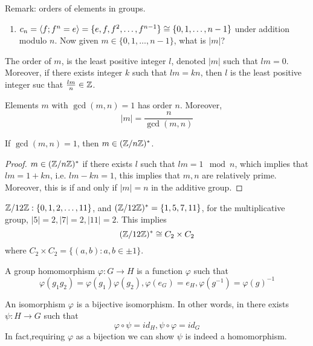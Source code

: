 Remark: orders of elements in groups.
\begin{enumerate}
    \item $c_n=\langle f; f^n=e\rangle=\{e, f, f^2, \dots, f^{n-1}\}\cong \{0,1,\dots, n-1\}$ under addition modulo $n$. Now given $m\in\{0,1,\dots,n-1\}$, what is $|m|$?
\end{enumerate}
\begin{defn}[order]
    The order of $m$, is the least positive integer $l$, denoted $|m|$ such that $lm=0$. Moreover, if there exists integer $k$ such that $lm=kn$, then $l$ is the least positive integer suc that $\frac{lm}{n}\in\mathbb{Z}$.
\end{defn}
\begin{prop}
    Elements $m$ with $\gcd(m,n)=1$ has order $n$.
    Moreover, 
    \begin{equation*}
        |m|=\frac{n}{\gcd(m,n)}
    \end{equation*}
\end{prop}
\begin{prop}
    If $\gcd(m,n)=1$, then $m\in(\mathbb{Z}/n\mathbb{Z})^*$.
\end{prop}
\begin{proof}
    $m\in(\mathbb{Z}/n\mathbb{Z})^*$ if there exists $l$ such that $lm=1\mod n$, which implies that $lm=1+kn$, i.e. $lm-kn=1$, this implies that $m,n$ are relatively prime. Moreover, this is if and only if $|m|=n$ in the additive group.
\end{proof}
\begin{example}
    $\mathbb{Z}/12\mathbb{Z}: \{0,1,2,\dots, 11\}$, and $(\mathbb{Z}/12\mathbb{Z})^*=\{1,5,7,11\}$, for the multiplicative group, $|5|=2, |7|=2, |11|=2$. This implies 
    \begin{equation*}
        (\mathbb{Z}/12\mathbb{Z})^*\cong C_2\times C_2
    \end{equation*}
    where $C_2\times C_2=\{(a,b):a, b\in \pm 1\}$.
\end{example}
\begin{defn}
    A group homomorphism $\varphi:G\to H$ is a function $\varphi$ such that 
    \begin{equation*}
        \varphi(g_1g_2)=\varphi(g_1)\varphi(g_2), \varphi(e_G)=e_H, \varphi(g^{-1})=\varphi(g)^{-1}
    \end{equation*}
\end{defn}
\begin{defn}[isomorphism]
    An isomorphism $\varphi$ is a bijective isomorphism. In other words, in there exists $\psi: H\to G$ such that 
    \begin{equation*}
        \varphi\circ\psi=id_H, \psi\circ\varphi=id_G
    \end{equation*}
    In fact,requiring $\varphi$ as a bijection we can show $\psi$ is indeed a homomorphism.
\end{defn}




